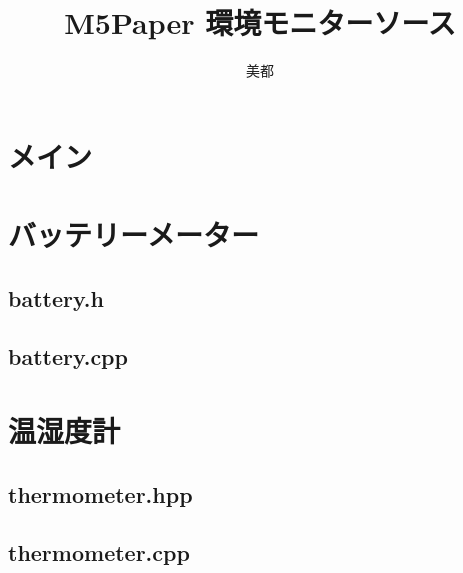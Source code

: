 \documentclass[a4paper, 10pt]{ltjsarticle}
\title{M5Paper 環境モニターソース}
\author{美都}
\begin{document}
\maketitle
\tableofcontents
\clearpage

\section {メイン}

\clearpage
\section {バッテリーメーター}
\subsection {battery.h}

\subsection {battery.cpp}

\clearpage

\section{温湿度計}
\subsection{thermometer.hpp}

\subsection{thermometer.cpp}

\end{document}
